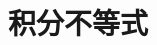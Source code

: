 \documentclass[../main.tex]{subfiles} %
\begin{document}
\chapter{积分不等式}



% 

% 

% 

% 

% 

% 

% 

% 

% 
\end{document}
